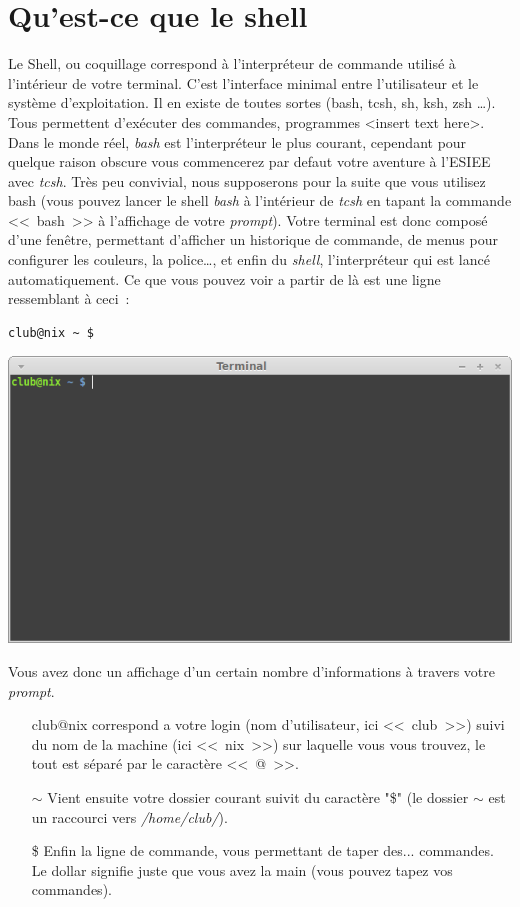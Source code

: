 \documentclass[french, a4paper, 12pt, titlepage]{article}
\begin{document}
\section{Qu'est-ce que le shell}
Le Shell, ou coquillage correspond à l'interpréteur de commande utilisé à l'intérieur de votre terminal.
C'est l'interface minimal entre l'utilisateur et le système d'exploitation.
Il en existe de toutes sortes (bash, tcsh, sh, ksh, zsh \dots). Tous permettent d'exécuter des commandes, programmes <insert text here>.
Dans le monde réel, \emph{bash} est l'interpréteur le plus courant, cependant pour quelque raison obscure vous commencerez par defaut votre aventure à l'ESIEE avec \emph{tcsh}.
Très peu convivial, nous supposerons pour la suite que vous utilisez bash (vous pouvez lancer le shell \emph{bash} à l'intérieur de \emph{tcsh} en tapant la commande <<~bash~>> à l'affichage de votre \emph{prompt}).
Votre terminal est donc composé d'une fenêtre, permettant d'afficher un historique de commande, de menus pour configurer les couleurs, la police\dots, et enfin du \emph{shell}, l'interpréteur qui est lancé automatiquement.
Ce que vous pouvez voir a partir de là est une ligne ressemblant à ceci~:
\begin{lstlisting}
club@nix ~ $
\end{lstlisting}
\begin{center}
\includegraphics[scale=0.42]{Images/terminal}
\end{center}
Vous avez donc un affichage d'un certain nombre d'informations à travers votre \emph{prompt}.
\begin{enumerate}
\item[club@nix] correspond a votre login (nom d'utilisateur, ici <<~club~>>) suivi du nom de la machine (ici <<~nix~>>) sur laquelle vous vous trouvez, le tout est séparé par le caractère <<~@~>>.
\item[$\sim$] Vient ensuite votre dossier courant suivit du caractère "\$" (le dossier $\sim$ est un raccourci vers \emph{/home/club/}).
\item[\$] Enfin la ligne de commande, vous permettant de taper des... commandes. Le dollar signifie juste que vous avez la main (vous pouvez tapez vos commandes).
\end{enumerate}
\end{document}
